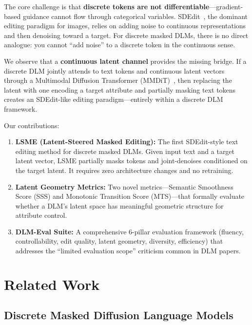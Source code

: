 \documentclass{article}
\begin{document}
The core challenge is that \textbf{discrete tokens are not differentiable}---gradient-based guidance cannot flow through categorical variables.
SDEdit~\cite{sdedit2022}, the dominant editing paradigm for images, relies on adding noise to continuous representations and then denoising toward a target.
For discrete masked DLMs, there is no direct analogue: you cannot ``add noise'' to a discrete token in the continuous sense.

We observe that a \textbf{continuous latent channel} provides the missing bridge.
If a discrete DLM jointly attends to text tokens and continuous latent vectors through a Multimodal Diffusion Transformer (MMDiT)~\cite{sd3_2024}, then replacing the latent with one encoding a target attribute and partially masking text tokens creates an SDEdit-like editing paradigm---entirely within a discrete DLM framework.

Our contributions:
\begin{enumerate}
    \item \textbf{LSME (Latent-Steered Masked Editing):} The first SDEdit-style text editing method for discrete masked DLMs. Given input text and a target latent vector, LSME partially masks tokens and joint-denoises conditioned on the target latent. It requires zero architecture changes and no retraining.
    \item \textbf{Latent Geometry Metrics:} Two novel metrics---Semantic Smoothness Score (SSS) and Monotonic Transition Score (MTS)---that formally evaluate whether a DLM's latent space has meaningful geometric structure for attribute control.
    \item \textbf{DLM-Eval Suite:} A comprehensive 6-pillar evaluation framework (fluency, controllability, edit quality, latent geometry, diversity, efficiency) that addresses the ``limited evaluation scope'' criticism common in DLM papers.
\end{enumerate}

\section{Related Work}

\subsection{Discrete Masked Diffusion Language Models}
\end{document}
